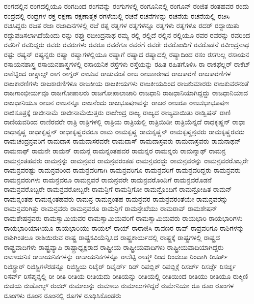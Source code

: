 {ರಂಗದಲ್ಲಿನ
ರಂಗದಲ್ಲಿಯೂ
ರಂಗದಿಂದ
ರಂಗವನ್ನು
ರಂಗುಗಳಲ್ಲಿ
ರಂಗೂನಿನಲ್ಲಿ
ರಂಗೂನ್
ರಂಜಿತ
ರಂತಹವರ
ರಂದು
ರಂದ್ರದಲ್ಲಿ
ರಂಧ್ರಗಳ
ರಕ್ತ
ರಕ್ಷಣಾ
ರಕ್ಷಣಾತ್ಮಕ
ರಗಳೆಯಲ್ಲಿ
ರಚನೆ
ರಚನೆಗಳನ್ನು
ರಚನೆಯ
ರಚನೆಯಲ್ಲಿ
ರಚಿಸಿ
ರಚಿಸಿದ್ದರು
ರಜತ
ರಜಾ
ರಜಾದಿನಗಳಲ್ಲಿ
ರಜೆ
ರತ್ನ
ರತ್ನಗಳ
ರತ್ನಗಳನ್ನೂ
ರತ್ನಗಳು
ರತ್ನಗಳೂ
ರದರ್
ರದ್ದಾಯಿತು
ರದ್ದುಪಡಿಸಲಾಗಿದೆಯೆಂದು
ರನ್ನು
ರಫ್ತು
ರಬೀಂದ್ರನಾಥ
ರಮ್ಯ
ರಲ್ಲಿ
ರಲ್ಲಿದೆ
ರಲ್ಲಿನ
ರಲ್ಲಿಯೂ
ರವರ
ರವರನ್ನು
ರವರಿಂದ
ರವರಿಗೆ
ರವರಿದ್ದರು
ರವರು
ರವರುಗಳು
ರವರೂ
ರವರೆಗೂ
ರವರೆಗೆ
ರವರೇ
ರವರೊಂದಿಗೆ
ರವರೊಡನೆ
ರವೀಂದ್ರನಾಥ
ರಷ್ಟು
ರಷ್ಯನ್
ರಷ್ಯನ್ನರು
ರಷ್ಯಾ
ರಷ್ಯಾಗಳಲ್ಲಿಯೂ
ರಷ್ಯಾಗೆ
ರಷ್ಯಾದ
ರಷ್ಯಾದಲ್ಲಿ
ರಷ್ಯಾದಿಂದ
ರಸಂ
ರಸಗುಲ್ಲ
ರಸಾಯನ
ರಸಾಯನಶಾಸ್ತ್ರ
ರಸಾಯನಶಾಸ್ತ್ರಗಳಲ್ಲಿ
ರಸಾಯನಿಕ
ರಸ್ತೆಗಳು
ರಸ್ತೆಯನ್ನು
ರಹಿತ
ರಹಿತಗೊಳಿಸಿ
ರಾ
ರಾಕಫೆಲ್ಲರ್
ರಾಕೆಟ್
ರಾಕೆಟ್ನಿಂದ
ರಾಕ್ಸಾಲ್ಟ್
ರಾಗ
ರಾಗ್ನರ್
ರಾಚುವ
ರಾಚುವಂತೆ
ರಾಜ
ರಾಜಕಾರಣದ
ರಾಜಕಾರಣಿ
ರಾಜಕಾರಣಿಗಳ
ರಾಜಕಾರಣಿಗಳು
ರಾಜಕಾರಣಿಗಳೂ
ರಾಜಕೀಯ
ರಾಜಕೀಯಗಳು
ರಾಜಕೀಯದಿಂದ
ರಾಜಕುಮಾರರು
ರಾಜಕುವರನಂತೆ
ರಾಜಗಾಂಭೀರ್ಯವೂ
ರಾಜಗೋಪಾಲರು
ರಾಜಗೋಪಾಲಾಚಾರಿ
ರಾಜಧಾನಿ
ರಾಜಧಾನಿಯಾಗಿದ್ದದ್ದು
ರಾಜಧಾನಿಯಾದ
ರಾಜಧಾನಿಯೂ
ರಾಜನ
ರಾಜನನ್ನೂ
ರಾಜನೆಂದು
ರಾಜಭೂಷಣವನ್ನು
ರಾಜರ
ರಾಜರೂ
ರಾಜಸಭಾಭೂಷಣ
ರಾಜಿಸೂತ್ರಕ್ಕೆ
ರಾಜೀನಾಮೆ
ರಾಜೀನಾಮೆಯಿತ್ತರು
ರಾಜೇಂದ್ರ
ರಾಜ್ಯ
ರಾಜ್ಯದ
ರಾಜ್ಯವಾಯಿತು
ರಾಡ್ವಿಷನ್
ರಾಣಿ
ರಾಣಿಯವರಿಂದ
ರಾಣಿರವರೇ
ರಾತ್ರಿ
ರಾತ್ರಿಗಳಲ್ಲಿ
ರಾತ್ರಿಯ
ರಾತ್ರಿಯಲ್ಲಿ
ರಾತ್ರಿಯಿಡೀ
ರಾತ್ರಿಯೆನ್ನದೆ
ರಾಧಕೃಷ್ಣನ್
ರಾಧಾ
ರಾಧಾಕೃಷ್ಣ
ರಾಧಾಕೃಷ್ಣನ್
ರಾಧಾಕೃಷ್ಣರವರೂ
ರಾಮ
ರಾಮಕೃಷ್ಣ
ರಾಮಕೃಷ್ಣನ್
ರಾಮಕೃಷ್ಣನ್ರವರು
ರಾಮಕೃಷ್ಣರವರು
ರಾಮಚಂದ್ರನ್ರವರಿಗೆ
ರಾಮದಾಸ
ರಾಮದಾಸರವರೇ
ರಾಮದಾಸ್
ರಾಮದಾಸ್ರವರು
ರಾಮದಾಸ್ರವರು
ರಾಮನಾಥನ್
ರಾಮನಾಥ್
ರಾಮನೇ
ರಾಮನ್
ರಾಮನ್ಗೆ
ರಾಮನ್ನಂತಹವರ
ರಾಮನ್ನರ
ರಾಮನ್ನರು
ರಾಮನ್ನಾಥ್
ರಾಮನ್ರ
ರಾಮನ್ರಂತಹವರು
ರಾಮನ್ರನ್ನು
ರಾಮನ್ರವರ
ರಾಮನ್ರವರಂತಹ
ರಾಮನ್ರವರದ್ದು
ರಾಮನ್ರವರನ್ನು
ರಾಮನ್ರವರರೊಬ್ಬರೇ
ರಾಮನ್ರವರಷ್ಟು
ರಾಮನ್ರವರಿಂದ
ರಾಮನ್ರವರಿಗಾಗಿ
ರಾಮನ್ರವರಿಗೂ
ರಾಮನ್ರವರಿಗೆ
ರಾಮನ್ರವರಿದ್ದರು
ರಾಮನ್ರವರು
ರಾಮನ್ರವರುಗಳು
ರಾಮನ್ರವರೂ
ರಾಮನ್ರವರೆ
ರಾಮನ್ರವರೇ
ರಾಮನ್ರವರೊಂದಿಗೆ
ರಾಮನ್ರವರೊಡನೆ
ರಾಮನ್ರವರೊಬ್ಬರೇ
ರಾಮನ್ರವರೋಬ್ಬರೇ
ರಾಮನ್ರಿಗೆ
ರಾಮನ್ರಿಗೋ
ರಾಮನ್ರೊಂದಿಗೆ
ರಾಮನ್ರೋಹಿತ
ರಾಮನ್
ರಾಮನ್ನಂತಹ
ರಾಮನ್ನಂತಹವರು
ರಾಮನ್ರ
ರಾಮನ್ರಂತಹ
ರಾಮನ್ರವರ
ರಾಮನ್ರವರಂತೆಯೇ
ರಾಮನ್ರವರನ್ನು
ರಾಮನ್ರವರಿಗಿತ್ತು
ರಾಮನ್ರವರು
ರಾಮನ್ರವರೂ
ರಾಮನ್ರಿಗೆ
ರಾಮನ್ರೇಖೆಯು
ರಾಮರಾವ್
ರಾಮಶೇಷನ್
ರಾಮಶೇಷನ್ರವರು
ರಾಮಸ್ವಾಮಿಯವರ
ರಾಮಸ್ವಾಮಿಯವರಿಗೆ
ರಾಮಸ್ವಾಮಿಯವರು
ರಾಯಭಾರಿ
ರಾಯಭಾರಿಗಳು
ರಾಯಭಾರಿಯಾಗಿಯೂ
ರಾಯಭಾರಿಯು
ರಾಯಲ್
ರಾಯ್
ರಾರಾಜಿಸಿ
ರಾವಣರ
ರಾವ್
ರಾವ್ರವರಿಗೂ
ರಾಶಿಗಳನ್ನು
ರಾಶಿಗಿಂತಲೂ
ರಾಶಿಯಿರುವ
ರಾಷ್ಟ್ರ
ರಾಷ್ಟ್ರಕವಿಯೆನ್ನಿಸಿದ
ರಾಷ್ಟ್ರಕಾರ್ಯದಲ್ಲಿ
ರಾಷ್ಟ್ರಕ್ಕೆ
ರಾಷ್ಟ್ರಗಳಲ್ಲಿ
ರಾಷ್ಟ್ರದ
ರಾಷ್ಟ್ರವಾದಿಗಳು
ರಾಷ್ಟ್ರವ್ಯಾಪಿ
ರಾಷ್ಟ್ರಾಧ್ಯಕ್ಷರಾದ
ರಾಷ್ಟ್ರೀಯ
ರಾಷ್ಟ್ರೀಯವಾದಿಗಳು
ರಾಷ್ಟ್ರೀಯವಾದಿಯಾಗಿದ್ದರು
ರಾಸಾಯನಿಕ
ರಾಸಾಯನಿಕಗಳನ್ನು
ರಾಸಾಯನಿಕಗಳನ್ನೂ
ರಾಸೆಟ್ಟಿ
ರಾಹ್ಮ್
ರಿಂದ
ರಿಂದಲೂ
ರಿಂದಾಗಿ
ರಿಚರ್ಡ್
ರಿಜಿಸ್ಟ್ರಾರ್
ರಿಜಿಸ್ಟ್ರಿಗಳೆರಡನ್ನೂ
ರಿಜಿಸ್ಟ್ರಿಯ
ರಿಟೈರ್
ರಿಟೈರ್ಡ್
ರಿಡ್
ರಿಪಬ್ಲಿಕ್
ರಿಪಬ್ಲಿಕ್ಗೆ
ರಿಸರ್ಚ್
ರಿಸರ್ಚ್ಗೆ
ರಿಸರ್ಚ್ನ
ರಿಸರ್ವ್
ರಿಸೆಪ್ಶನ್ನಲ್ಲಿ
ರೀ
ರೀತಿ
ರೀತಿಯ
ರೀತಿಯದು
ರೀತಿಯನ್ನು
ರೀತಿಯಲ್ಲಿ
ರೀತಿಯಿಂದ
ರೀತಿಯು
ರೀತಿಯೂ
ರುಕ್ಮಿಣಿ
ರುಚಿಯ
ರುಡೋಲ್ಭ್
ರುದರ್
ರುಮಾಲನ್ನು
ರುಮಾಲು
ರುಮಾಲುಗಳಿದ್ದರೆ
ರುಮೇನಿಯಾ
ರೂ
ರೂಂ
ರೂಂಗಳ
ರೂಂಗಳು
ರೂಂನ
ರೂಂನಲ್ಲಿ
ರೂಗಳ
ರೂಢಿಸಿಕೊಂಡರು
}
